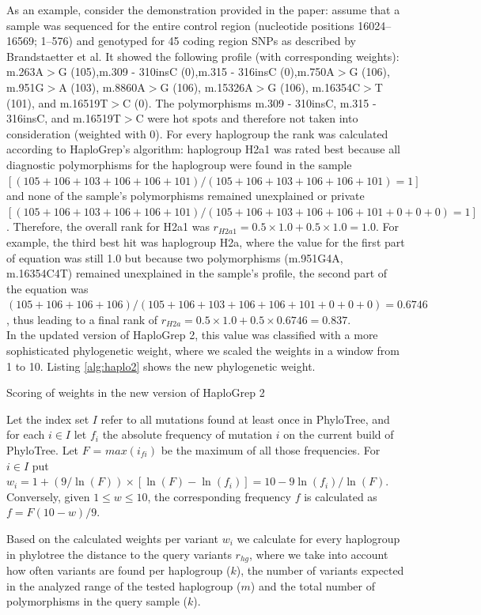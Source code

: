 As an example, consider the demonstration provided in the paper\cite{Kloss-Brandstatter2011}: assume that a sample was sequenced for the entire control region (nucleotide positions 16024–16569; 1–576) and genotyped for 45 coding region SNPs as described by Brandstaetter et al. It showed the following profile (with corresponding weights): m.263A$>$G (105),m.309 - 310insC (0),m.315 - 316insC (0),m.750A$>$G (106), m.951G$>$A (103), m.8860A$>$G (106), m.15326A$>$G (106), m.16354C$>$T (101), and m.16519T$>$C (0). The polymorphisms m.309 - 310insC, m.315 - 316insC, and m.16519T$>$C were hot spots and therefore not taken into consideration (weighted with 0). For every haplogroup the rank was calculated according to HaploGrep's algorithm: haplogroup H2a1 was rated best because all diagnostic polymorphisms for the haplogroup were found in the sample $[(105+106+103+106+106+101)/(105+106+103+106+106+101) = 1]$ and none of the sample’s polymorphisms remained unexplained or private $[(105+106+103+106+106+ 101)/(105+106+103+106+106+101+0+0+0)=1]$. Therefore, the overall rank for H2a1 was $r_{H2a1}=0.5\times 1.0 + 0.5 \times 1.0 = 1.0$. For example, the third best hit was haplogroup H2a, where the value for the first part of equation was still 1.0 but because two polymorphisms (m.951G4A, m.16354C4T) remained unexplained in the sample’s profile, the second part of the equation was $(105+106+106+106)/(105+106+103+106+106+101+0+0+0) = 0.6746$, thus leading to a final rank of $r_{H2a}= 0.5\times 1.0 + 0.5\times 0.6746 =0.837$.\\
In the updated version of HaploGrep 2, this value was classified with a more sophisticated phylogenetic weight, where we scaled the weights in a window from 1 to 10. Listing \ref{alg:haplo2} shows the new phylogenetic weight.
\begin{algorithm}
\caption{Scoring of weights in the new version of HaploGrep 2}
\label{alg:haplo2}
Let the index set $I$ refer to all mutations found at least once in PhyloTree, and for each $i \in I$ let $f_i$ the absolute frequency of mutation $i$ on the current build of PhyloTree. Let $F$ = $max(i_{fi})$ be the maximum of all those frequencies. For $i \in I$ put $w_i = 1+(9/\ln(F)) \times [\ln(F) - \ln(f_i)] = 10-9\ln(f_i) / \ln(F)$. Conversely, given $1 \leq w \leq 10$, the corresponding frequency $f$ is calculated as  $f = F(10 - w)/9$.
\end{algorithm}

Based on the calculated weights per variant $w_i$ we calculate for every haplogroup in phylotree the distance to the query variants $r_{hg}$, where we take into account how often variants are found per haplogroup ($k$), the number of variants expected in the analyzed range of the tested haplogroup ($m$) and the total number of polymorphisms in the query sample ($k$).

